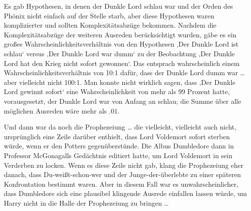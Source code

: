 Es gab Hypothesen, in denen der Dunkle Lord schlau war und der Orden des Phönix nicht einfach auf der Stelle starb, aber diese Hypothesen waren komplizierter und sollten Komplexitätsabzüge bekommen. Nachdem die Komplexitätsabzüge der weiteren Ausreden berücksichtigt wurden, gäbe es ein großes Wahrscheinlichkeitsverhältnis von den Hypothesen ‚Der Dunkle Lord ist schlau‘ versus ‚Der Dunkle Lord war dumm‘ zu der Beobachtung ‚Der Dunkle Lord hat den Krieg nicht sofort gewonnen‘. Das entsprach wahrscheinlich einem Wahrscheinlichkeitsverhältnis von 10:1 dafür, dass der Dunkle Lord dumm war … aber vielleicht nicht 100:1. Man konnte nicht wirklich sagen, dass ‚Der Dunkle Lord gewinnt sofort‘ eine Wahrscheinlichkeit von mehr als 99 Prozent hatte, vorausgesetzt, der Dunkle Lord war von Anfang an schlau; die Summe über alle möglichen Ausreden wäre mehr als $.01$.


Und dann war da noch die Prophezeiung … die vielleicht, vielleicht auch nicht, ursprünglich eine Zeile darüber enthielt, dass Lord Voldemort sofort sterben würde, wenn er den Potters gegenüberstünde. Die Albus Dumbledore dann in Professor McGonagalls Gedächtnis editiert hatte, um Lord Voldemort in sein Verderben zu locken. Wenn es diese Zeile nicht gab, klang die Prophezeiung eher danach, dass Du-weißt-schon-wer und der Junge-der-überlebte zu einer späteren Konfrontation bestimmt waren. Aber in diesem Fall war es unwahrscheinlicher, dass Dumbledore sich eine plausibel klingende Ausrede einfallen lassen würde, um Harry nicht in die Halle der Prophezeiung zu bringen …

